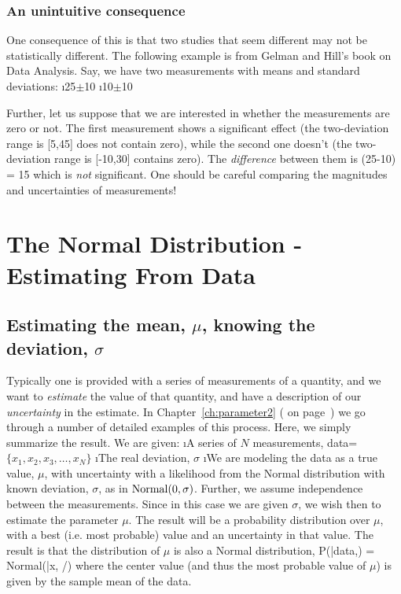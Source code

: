 \subsubsection{An unintuitive consequence}

One consequence of this is that two studies that seem different may not be statistically different.  The following example is from Gelman and Hill's book on Data Analysis.\cite{gelman2007data} Say, we have two measurements with means and standard deviations:
\bi
\i 25$\pm$10
\i 10$\pm$10
\ei

Further, let us suppose that we are interested in whether the measurements are zero or not.  The first measurement shows a significant effect (the two-deviation range is [5,45] does not contain zero), while the second one doesn't (the two-deviation range is [-10,30] contains zero).  The {\em difference} between them is 
\beqn
(25-10) \pm {} = 15
\eeqn
which is {\em not} significant.  One should be careful comparing the magnitudes and uncertainties of measurements!


\section{The Normal Distribution - Estimating From Data}

\subsection{Estimating the mean, $\mu$, knowing the deviation, $\sigma$}\label{sec:estmean}

Typically one is provided with a series of measurements of a quantity, and we want to \emph{estimate} the value of that quantity, and have a description of our \emph{uncertainty} in the estimate.  In Chapter~\ref{ch:parameter2} (\emph{} on page~\pageref{ch:parameter2}) we go through a number of detailed examples of this process.  Here, we simply summarize the result.  We are given:
\be
\i A series of $N$ measurements, data=$\{x_{1}, x_{2}, x_{3}, \ldots, x_{N}\}$ 
\i The real deviation, $\sigma$
\i We are modeling the data as a true value, $\mu$, with uncertainty with a likelihood from the Normal distribution with known deviation, $\sigma$, as in ${\rm Normal}(0,\sigma)$.  Further, we assume independence between the measurements.
\ee
 Since in this case we are given $\sigma$, we wish then to estimate the parameter $\mu$.  The result will be a probability distribution over $\mu$, with a best (i.e. most probable) value and an uncertainty in that value.  The result is that the distribution of $\mu$ is also a Normal distribution,
\beqn
P(\mu|{\rm data},\sigma) = {\rm Normal}(\bar{x}, \sigma/)
\eeqn where the center value (and thus the most probable value of $\mu$) is given by the sample mean of the data.

